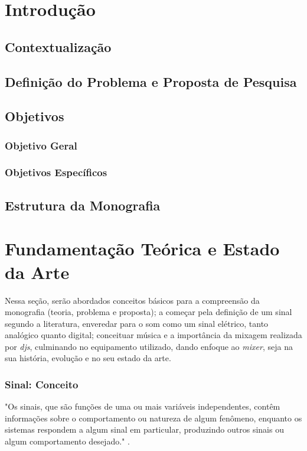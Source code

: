 \chapter[Introdução]{Introdução}
\section{Contextualização}
\section{Definição do Problema e Proposta de Pesquisa}
\section{Objetivos}
\subsection{Objetivo Geral}
\subsection{Objetivos Específicos}
\section{\textbf{Estrutura da Monografia}}


\chapter[Fundamentação Teórica e Estado da Arte]{Fundamentação Teórica e Estado da Arte}

Nessa seção, serão abordados conceitos básicos para a compreensão da monografia (teoria, problema e proposta); a começar pela definição de um sinal segundo a literatura, enveredar para o som como um sinal elétrico, tanto analógico quanto digital; conceituar música e a importância da mixagem realizada por \textit{djs}, culminando no equipamento utilizado, dando enfoque ao \textit{mixer}, seja na sua história, evolução e no seu estado da arte.


\newpage
\subsection{Sinal: Conceito}

\begin{citacao}
"Os sinais, que são funções de uma ou mais variáveis independentes, contêm informações sobre o comportamento ou natureza de algum fenômeno, enquanto os sistemas respondem a algum sinal em particular, produzindo outros sinais ou algum comportamento desejado." \cite{oppenheim2010sinais}.
\end{citacao}

